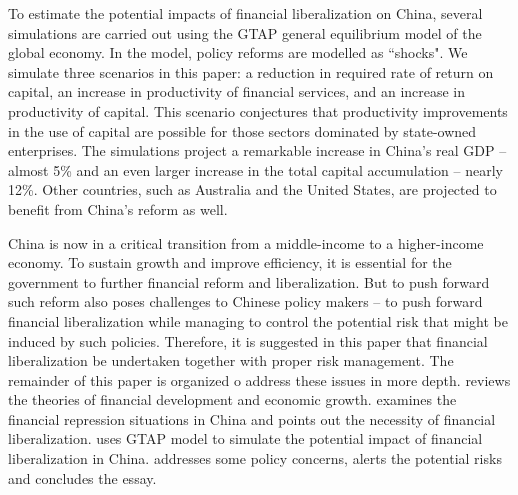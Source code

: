 \documentclass[AER]{AEA}
\begin{document}
To estimate the potential impacts of financial liberalization on China, 
several simulations are carried out using the GTAP general equilibrium 
model of the global economy. 
In the model, policy reforms are modelled as ``shocks". 
We simulate three scenarios in this paper: 
a reduction in required rate of return on capital, 
an increase in productivity of financial services, 
and an increase in productivity of capital. 
This scenario conjectures that productivity improvements in the use of 
capital are possible for those sectors dominated by state-owned enterprises.
The simulations project a remarkable increase in China's real GDP -- 
almost 5\% and an even larger increase in the total capital 
accumulation -- nearly 12\%. 
Other countries, such as Australia and the United States,  are projected to 
benefit from China's reform as well.

China is now in a critical transition from a middle-income to 
a higher-income economy. To sustain growth and improve efficiency, it is 
essential for the government to further financial reform and liberalization.
But to push forward such reform also poses challenges to Chinese policy makers 
-- to push forward financial liberalization while managing to control 
the potential risk that might be induced by such policies.   
Therefore, it is suggested in this paper that financial liberalization be undertaken 
together with proper risk management.
The remainder of this paper is organized o address these issues in more depth.
 reviews the theories of financial development and 
economic growth.
 examines the financial repression situations in 
China and points out the necessity of financial liberalization. 
 uses GTAP model to simulate the potential impact of 
financial liberalization in China. 
 addresses some policy concerns, alerts the potential 
risks and concludes the essay.\\




\end{document}
